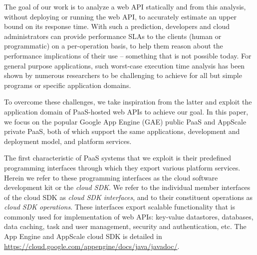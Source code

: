 The goal of our work is to analyze a web API statically and from this analysis, 
without deploying or running the web API, 
to accurately estimate an upper bound on its response time. With such a prediction,
developers and cloud administrators can provide performance SLAs to the clients (human or 
programmatic) on a per-operation basis, to help them reason about 
the performance implications of their use -- something that is not possible today.
For general purpose applications, such worst-case execution time analysis has been shown
by numerous researchers to be challenging to achieve for all but 
simple programs or specific application domains.

To overcome these challenges, we take inspiration from the latter and exploit 
the application domain of PaaS-hosted web APIs to achieve our goal.  
In this paper, we focus on the popular Google App Engine (GAE) public PaaS 
and AppScale private PaaS, both of which support the same applications, 
development and deployment model, and platform services.

The first characteristic of PaaS systems
that we exploit is their predefined programming interfaces 
through which they export various platform services. 
Herein we refer to these programming interfaces as the cloud software development 
kit or the \textit{cloud SDK}. We refer to the individual member interfaces of the cloud SDK
as \textit{cloud SDK interfaces}, and to their constituent operations 
as \textit{cloud SDK operations}.  These interfaces export scalable
functionality that is commonly used for implementation of web APIs:  
key-value datastores, databases,
data caching, task and user management, security and authentication, etc.
The App Engine and AppScale cloud SDK is detailed 
in \url{https://cloud.google.com/appengine/docs/java/javadoc/}. 


